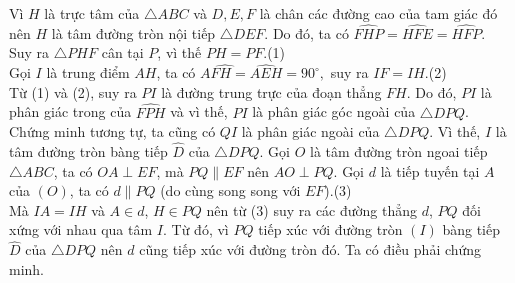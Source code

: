 \begin{bt}
{\begin{center}
		\end{center}
		Vì $H$ là trực tâm của $\triangle ABC$ và $D,E,F$ là chân các đường cao của tam giác đó nên $H$ là tâm đường tròn nội tiếp $\triangle DEF$. Do đó, ta có $\widehat{FHP}=\widehat{HFE}=\widehat{HFP}.$\\
		Suy ra $\triangle PHF$ cân tại $P$, vì thế $PH=PF$.\hfill (1)\\
		Gọi $I$ là trung điểm $AH$, ta có $\widehat{AFH=}\widehat{AEH}=90^\circ,$
		suy ra $IF=IH$.\hfill (2)\\
		Từ (1) và (2), suy ra $PI$ là đường trung trực của đoạn thẳng $FH$. Do đó, $PI$ là phân giác trong của $\widehat{FPH}$ và vì thế, $PI$ là phân giác góc ngoài của $\triangle DPQ$.
		Chứng minh tương tự, ta cũng có $QI$ là phân giác ngoài của $\triangle DPQ$. Vì thế, $I$ là tâm đường tròn bàng tiếp $\widehat{D}$ của $\triangle DPQ$.
		Gọi $O$ là tâm đường tròn ngoai tiếp $\triangle ABC$, ta có $OA\perp EF$, mà $PQ\parallel EF$ nên $AO\perp PQ$.
		Gọi $d$ là tiếp tuyến tại $A$ của $(O)$, ta có $d\parallel PQ$ (do cùng song song với $EF$).\hfill (3)\\
		Mà $IA=IH$ và $A\in d$, $H\in PQ$ nên từ (3) suy ra các đường thẳng $d$, $PQ$ đối xứng với nhau qua tâm $I$.
		Từ đó, vì $PQ$ tiếp xúc với đường tròn $(I)$ bàng tiếp $\widehat{D}$ của $\triangle DPQ$ nên $d$ cũng tiếp xúc với đường tròn đó. Ta có điều phải chứng minh.
	}
\end{bt}
